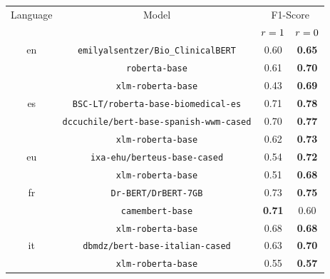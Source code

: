 \begin{tabular}{@{}cccc@{}}%
\toprule%
Language&Model&\multicolumn{2}{c}{F1-Score}\\%
&&$r=1$&$r=0$\\%
\midrule%
en&\verb|emilyalsentzer/Bio_ClinicalBERT|&0.60&\textbf{0.65}\\%
&\verb|roberta-base|&0.61&\textbf{0.70}\\%
&\verb|xlm-roberta-base|&0.43&\textbf{0.69}\\%
\midrule%
es&\verb|BSC-LT/roberta-base-biomedical-es|&0.71&\textbf{0.78}\\%
&\verb|dccuchile/bert-base-spanish-wwm-cased|&0.70&\textbf{0.77}\\%
&\verb|xlm-roberta-base|&0.62&\textbf{0.73}\\%
\midrule%
eu&\verb|ixa-ehu/berteus-base-cased|&0.54&\textbf{0.72}\\%
&\verb|xlm-roberta-base|&0.51&\textbf{0.68}\\%
\midrule%
fr&\verb|Dr-BERT/DrBERT-7GB|&0.73&\textbf{0.75}\\%
&\verb|camembert-base|&\textbf{0.71}&0.60\\%
&\verb|xlm-roberta-base|&0.68&\textbf{0.68}\\%
\midrule%
it&\verb|dbmdz/bert-base-italian-cased|&0.63&\textbf{0.70}\\%
&\verb|xlm-roberta-base|&0.55&\textbf{0.57}\\\bottomrule%
%
\end{tabular}